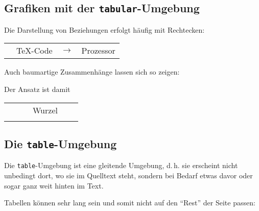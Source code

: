 \subsection{Grafiken mit der \texttt{tabular}-Umgebung}

Die Darstellung von Beziehungen erfolgt häufig mit Rechtecken:


\begin{tabular}{p{1cm}|p{2cm}|p{1cm}|p{4cm}|}
  \cline{2-2}\cline{4-4}
  & \TeX-Code & \(\rightarrow\)& Prozessor \\
  \cline{2-2}\cline{4-4}
\end{tabular}

Auch baumartige Zusammenhänge lassen sich so zeigen:


Der Ansatz ist damit

\begin{tabular}{*{7}{p{1cm}}}  %
  \cline{4-5}         %
  &  & & \multicolumn{2}{|c|}{Wurzel} &  \\
  \cline{4-5}
  &  & & \multicolumn{1}{c|}{} & \\
\end{tabular}

\subsection{Die \texttt{table}-Umgebung}

Die \texttt{table}-Umgebung ist eine gleitende Umgebung, d.\,h. sie
erscheint nicht unbedingt dort, wo sie im Quelltext steht, sondern bei
Bedarf etwas davor oder sogar ganz weit hinten im Text.

Tabellen können sehr lang sein und somit nicht auf den "`Rest"' der Seite
passen:

